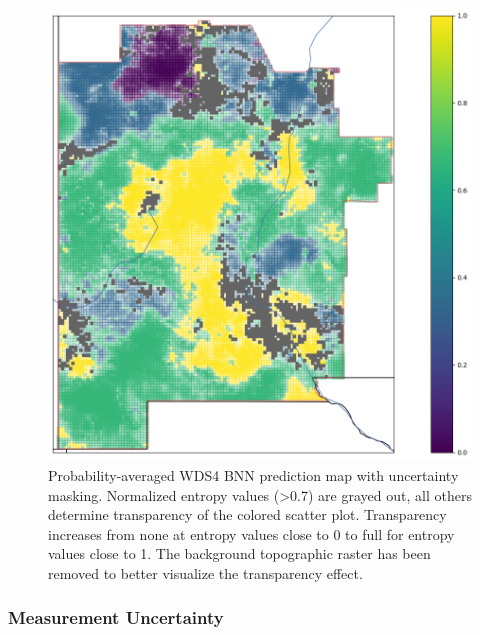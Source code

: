 \begin{figure}[!htp]
\centering
\includegraphics[width=.8\textwidth]{templates/images/Figure-BNN_All_Gradient_Map_Masked_whitebackground.png}
\caption[Parameter uncertainty mask on BNN prediction map]
{Probability-averaged WDS4 BNN prediction map with uncertainty masking. Normalized entropy values (>0.7) are grayed out, all others determine transparency of the colored scatter plot. Transparency increases from none at entropy values close to 0 to full for entropy values close to 1. The background topographic raster has been removed to better visualize the transparency effect.}
\label{fig:bnn_masked_pred_map}
\end{figure}

\subsubsection{Measurement Uncertainty}
